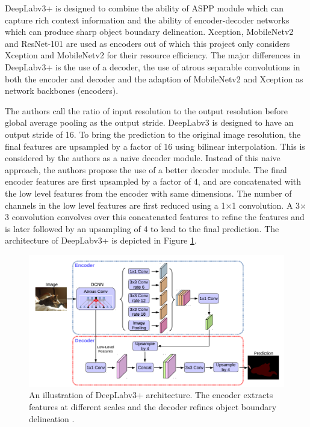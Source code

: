 DeepLabv3+ is designed to combine the ability of ASPP module which can capture rich context information and the ability of encoder-decoder networks which can produce sharp object boundary delineation. Xception, MobileNetv2 and ResNet-101 are used as encoders out of which this project only considers Xception and MobileNetv2 for their resource efficiency. The major differences in DeepLabv3+ is the use of a decoder, the use of atrous separable convolutions in both the encoder and decoder and the adaption of MobileNetv2 and Xception as network backbones (encoders).

The authors call the ratio of input resolution to the output resolution before global average pooling as the output stride. DeepLabv3 is designed to have an output stride of 16. To bring the prediction to the original image resolution, the final features are upsampled by a factor of 16 using bilinear interpolation. This is considered by the authors as a naive decoder module. Instead of this naive approach, the authors propose the use of a better decoder module. The final encoder features are first upsampled by a factor of 4, and are concatenated with the low level features from the encoder with same dimensions. The number of channels in the low level features are first reduced using a 1$\times$1 convolution. A 3$\times$3 convolution convolves over this concatenated features to refine the features and is later followed by an upsampling of 4 to lead to the final prediction. The architecture of DeepLabv3+ is depicted in Figure \ref{Fig:deepLabv4}.

	\begin{figure}
		\centering
		\includegraphics[width=1\linewidth]{images/deepLabv4}
		\caption{An illustration of DeepLabv3+ architecture. The encoder extracts features at different scales and the decoder refines object boundary delineation \cite{DBLP:journals/corr/abs-1802-02611}.}
		\label{Fig:deepLabv4}
	\end{figure}

